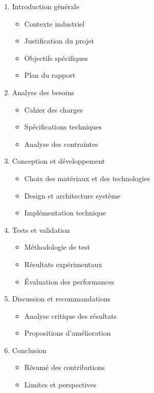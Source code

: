 \begin{enumerate}
    \item Introduction générale
          \begin{itemize}
              \item Contexte industriel
              \item Justification du projet
              \item Objectifs spécifiques
              \item Plan du rapport
          \end{itemize}
    \item Analyse des besoins
          \begin{itemize}
              \item Cahier des charges
              \item Spécifications techniques
              \item Analyse des contraintes
          \end{itemize}
    \item Conception et développement
          \begin{itemize}
              \item Choix des matériaux et des technologies
              \item Design et architecture système
              \item Implémentation technique
          \end{itemize}
    \item Tests et validation
          \begin{itemize}
              \item Méthodologie de test
              \item Résultats expérimentaux
              \item Évaluation des performances
          \end{itemize}
    \item Discussion et recommandations
          \begin{itemize}
              \item Analyse critique des résultats
              \item Propositions d'amélioration
          \end{itemize}
    \item Conclusion
          \begin{itemize}
              \item Résumé des contributions
              \item Limites et perspectives
          \end{itemize}

\end{enumerate}


